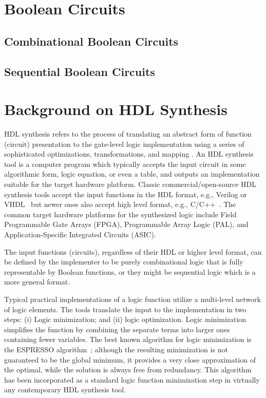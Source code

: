 \section{Boolean Circuits}
\subsection{Combinational Boolean Circuits}
\subsection{Sequential Boolean Circuits}

\section{Background on HDL Synthesis}
HDL synthesis refers to the process of translating an abstract form of  function (circuit) presentation to the gate-level logic implementation using a series of sophisticated optimizations, transformations, and mapping \cite{sentovich1992sis,micheli1994synthesis,devadas1994logic,brayton1987mis}.
An HDL synthesis tool is a computer program which typically accepts the input circuit in some algorithmic form, logic equation, or even a table, and outputs an implementation suitable for the target hardware platform.
Classic commercial/open-source HDL synthesis tools accept the input functions in the HDL format, e.g., Verilog or VHDL~\cite{tool:DesignCompiler,tool:ABC,tool:Encounter,tool:HDLdesigner,tool:PandA,decaluwe2004myhdl} but newer ones also accept high level format, e.g., C/C++~\cite{Gupta2004, tool:Vivado}.
The common target hardware platforms for the synthesized logic include Field Programmable Gate Arrays (FPGA), Programmable Array Logic (PAL), and Application-Specific Integrated Circuits (ASIC).

The input functions (circuits), regardless of their HDL or higher level format, can be defined by the implementer to be purely combinational logic that is fully representable by Boolean functions, or they might be sequential logic which is a more general format.

Typical practical implementations of a logic function utilize a multi-level network of logic elements.
The tools translate the input to the implementation in two steps: (i) Logic minimization; and (ii) logic optimization.
Logic minimization simplifies the function by combining the separate terms into larger ones containing fewer variables.
The best known algorithm for logic minimization is the ESPRESSO algorithm~\cite{brayton1984logic}; although the resulting minimization is not guaranteed to be the global minimum, it provides a very close approximation of the optimal, while the solution is always free from redundancy.
This algorithm has been incorporated as a standard logic function minimization step in virtually any contemporary HDL synthesis tool.

